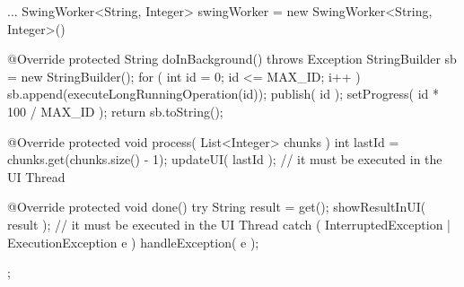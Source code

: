 \begin{javacode}{2}
...
SwingWorker<String, Integer> swingWorker = new SwingWorker<String, Integer>()
{
	@Override
	protected String doInBackground() throws Exception
	{
		StringBuilder sb = new StringBuilder();
		for ( int id = 0; id <= MAX_ID; i++ )
		{
			sb.append(executeLongRunningOperation(id));
			publish( id );
			setProgress( id * 100 / MAX_ID );
		}
		return sb.toString();
	}

	@Override
	protected void process( List<Integer> chunks )
	{
		int lastId = chunks.get(chunks.size() - 1);
		updateUI( lastId ); // it must be executed in the UI Thread
	}

	@Override
	protected void done()
	{
		try
		{
			String result = get();
			showResultInUI( result );  // it must be executed in the UI Thread
		}
		catch ( InterruptedException | ExecutionException e )
		{
			handleException( e );
		}
	}
};
\end{javacode}
